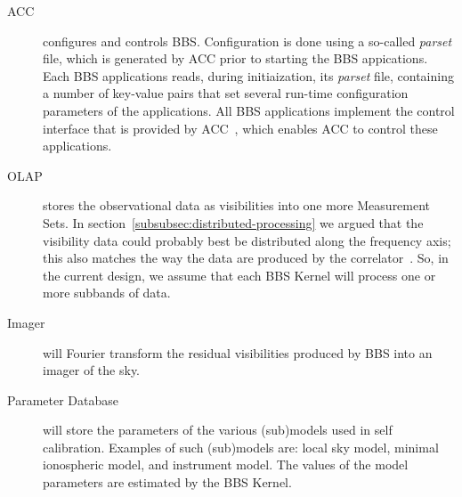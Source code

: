 \documentclass[10pt]{lofar}
\begin{document}
\begin{description}
\item [ACC] configures and controls BBS. Configuration is done using a
so-called \emph{parset} file, which is generated by ACC prior to starting the
BBS appications. Each BBS applications reads, during initiaization, its
\emph{parset} file, containing a number of key-value pairs that set several
run-time configuration parameters of the applications. All BBS applications
implement the control interface that is provided by
ACC~\cite{LOFAR-ASTRON-SDD-037}, which enables ACC to control these
applications.
\item [OLAP] stores the observational data as visibilities into one more
Measurement Sets. In section~\ref{subsubsec:distributed-processing} we argued
that the visibility data could probably best be distributed along the frequency
axis; this also matches the way the data are produced by the
correlator~\cite{LOFAR-ASTRON-SDD-036}. So, in the current design, we assume
that each BBS Kernel will process one or more subbands of data.
\item [Imager] will Fourier transform the residual visibilities produced by BBS
into an imager of the sky.
\item [Parameter Database] \sloppy will store the parameters of the various
(sub)models used in self calibration. Examples of such (sub)models are: local
sky model, minimal ionospheric model, and instrument model. The values of the
model parameters are estimated by the BBS Kernel.
\end{description}
\end{document}
